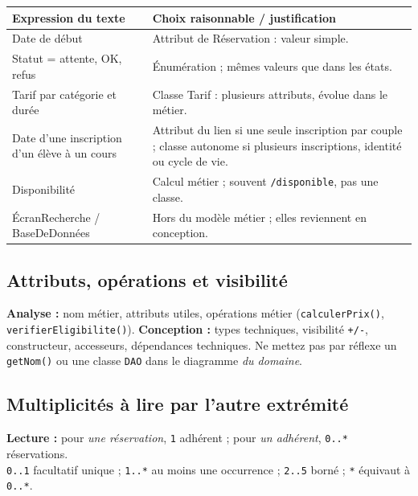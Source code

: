 \documentclass[10pt,a4paper]{article}
\begin{document}
\begin{tabularx}{\linewidth}{@{}p{38mm}X@{}}
\toprule
Expression du texte & Choix raisonnable / justification \\
\midrule
Date de début & Attribut de Réservation : valeur simple. \\
Statut = {attente, OK, refus} & Énumération ; mêmes valeurs que dans les états. \\
Tarif par catégorie et durée & Classe Tarif : plusieurs attributs, évolue dans le métier. \\
Date d'une inscription d'un élève à un cours & Attribut du lien si une seule inscription par couple ; classe autonome si plusieurs inscriptions, identité ou cycle de vie. \\
Disponibilité & Calcul métier ; souvent \texttt{/disponible}, pas une classe. \\
ÉcranRecherche / BaseDeDonnées & Hors du modèle métier ; elles reviennent en conception. \\
\bottomrule
\end{tabularx}
\subsection{Attributs, opérations et visibilité}
\textbf{Analyse :} nom métier, attributs utiles, opérations métier (\texttt{calculerPrix()}, \texttt{verifierEligibilite()}). \textbf{Conception :} types techniques, visibilité \texttt{+/-}, constructeur, accesseurs, dépendances techniques. Ne mettez pas par réflexe un \texttt{getNom()} ou une classe \texttt{DAO} dans le diagramme \emph{du domaine}.

\subsection{Multiplicités à lire par l'autre extrémité}
\begin{center}
\end{center}
\textbf{Lecture :} pour \emph{une réservation}, \texttt{1} adhérent ; pour \emph{un adhérent}, \texttt{0..*} réservations.\\
\texttt{0..1} facultatif unique ; \texttt{1..*} au moins une occurrence ; \texttt{2..5} borné ; \texttt{*} équivaut à \texttt{0..*}.
\end{document}
